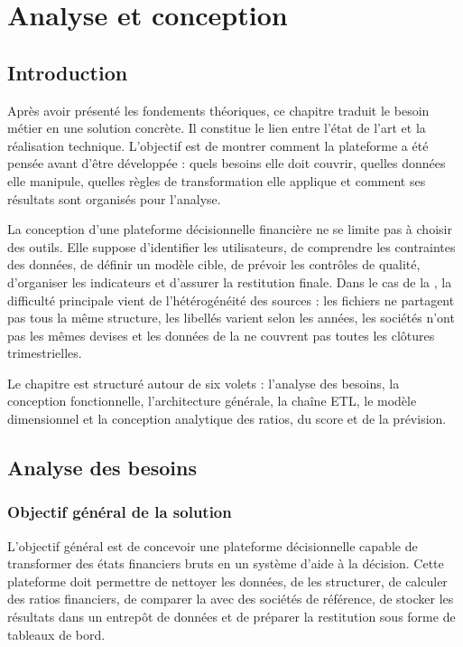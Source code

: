 \chapter{Analyse et conception}
\label{chapter:conception}


\section*{Introduction}
\par Après avoir présenté les fondements théoriques, ce chapitre traduit le
besoin métier en une solution concrète. Il constitue le lien entre l'état de
l'art et la réalisation technique. L'objectif est de montrer comment la
plateforme a été pensée avant d'être développée : quels besoins elle doit
couvrir, quelles données elle manipule, quelles règles de transformation elle
applique et comment ses résultats sont organisés pour l'analyse.

\par La conception d'une plateforme décisionnelle financière ne se limite pas à
choisir des outils. Elle suppose d'identifier les utilisateurs, de comprendre les
contraintes des données, de définir un modèle cible, de prévoir les contrôles de
qualité, d'organiser les indicateurs et d'assurer la restitution finale. Dans le
cas de la \sfbt, la difficulté principale vient de l'hétérogénéité des sources :
les fichiers ne partagent pas tous la même structure, les libellés varient selon
les années, les sociétés n'ont pas les mêmes devises et les données de la \sfbt
ne couvrent pas toutes les clôtures trimestrielles.

\par Le chapitre est structuré autour de six volets : l'analyse des besoins, la
conception fonctionnelle, l'architecture générale, la chaîne \ac{ETL}, le modèle
dimensionnel et la conception analytique des ratios, du score et de la
prévision.

\section{Analyse des besoins}
\label{sec:besoins}
\subsection{Objectif général de la solution}
\par L'objectif général est de concevoir une plateforme décisionnelle capable de
transformer des états financiers bruts en un système d'aide à la décision. Cette
plateforme doit permettre de nettoyer les données, de les structurer, de
calculer des ratios financiers, de comparer la \sfbt avec des sociétés de
référence, de stocker les résultats dans un entrepôt de données et de préparer
la restitution sous forme de tableaux de bord.

